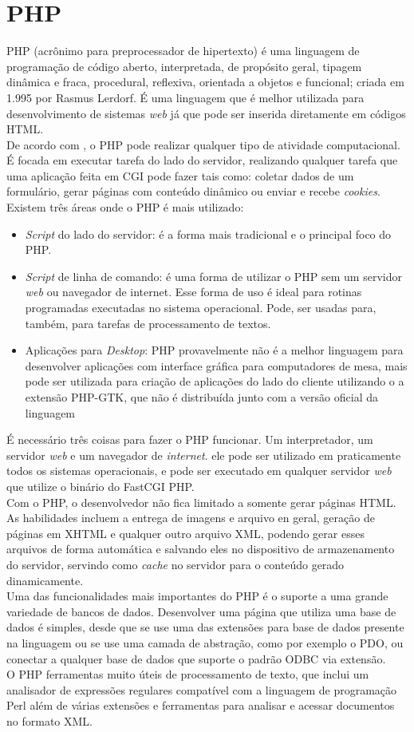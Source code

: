 \section{PHP}
PHP (acrônimo para preprocessador de hipertexto) é uma linguagem de programação de código aberto, interpretada, de propósito geral, tipagem dinâmica e fraca, procedural, reflexiva, orientada a objetos e funcional; criada em 1.995 por Rasmus Lerdorf. É uma linguagem que é melhor utilizada para desenvolvimento de sistemas \textit{web} já que pode ser inserida diretamente em códigos HTML.\\
De acordo com , o PHP pode realizar qualquer tipo de atividade computacional. É focada em executar tarefa do lado do servidor, realizando qualquer tarefa que uma aplicação feita em CGI pode fazer tais como: coletar dados de um formulário, gerar páginas com conteúdo dinâmico ou enviar e recebe \textit{cookies}. Existem três áreas onde o PHP é mais utilizado:
\begin{itemize}
	\item \textit{Script} do lado do servidor: é a forma mais tradicional e o principal foco do PHP.
	\item \textit{Script} de linha de comando: é uma forma de utilizar o PHP sem um servidor \textit{web} ou navegador de internet. Esse forma de uso é ideal para rotinas programadas executadas no sistema operacional. Pode, ser usadas para, também, para tarefas de processamento de textos.
	\item Aplicações para \textit{Desktop}: PHP provavelmente não é a melhor linguagem para desenvolver aplicações com interface gráfica para computadores de mesa, mais pode ser utilizada para criação de aplicações do lado do cliente utilizando o a extensão PHP-GTK, que não é distribuída junto com a versão oficial da linguagem
\end{itemize}
É necessário três coisas para fazer o PHP funcionar. Um interpretador, um servidor \textit{web} e um navegador de \textit{internet}. ele pode ser utilizado em praticamente todos os sistemas operacionais, e pode ser executado em qualquer servidor \textit{web} que utilize o binário do FastCGI PHP.\\
Com o PHP, o desenvolvedor não fica limitado a somente gerar páginas HTML. As habilidades incluem a entrega de imagens e arquivo en geral, geração de páginas em XHTML e qualquer outro arquivo XML, podendo gerar esses arquivos de forma automática e salvando eles no dispositivo de armazenamento do servidor, servindo como \textit{cache} no servidor para o conteúdo gerado dinamicamente.\\
Uma das funcionalidades mais importantes do PHP é o suporte a uma grande variedade de bancos de dados. Desenvolver uma página que utiliza uma base de dados é simples, desde que se use uma das extensões para base de dados presente na linguagem ou se use uma camada de abstração, como por exemplo o PDO, ou conectar a qualquer base de dados que suporte o padrão ODBC via extensão.\\
O PHP ferramentas muito úteis de processamento de texto, que inclui um analisador de expressões regulares compatível com a linguagem de programação Perl além de várias extensões e ferramentas para analisar e acessar documentos no formato XML.
